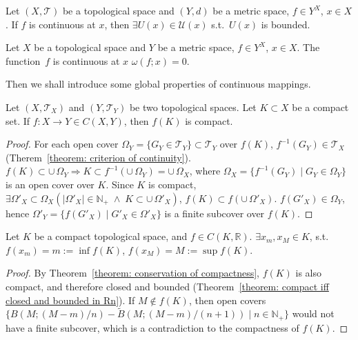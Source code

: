 \documentclass[openany]{book}
\begin{document}
\begin{theorem}
	Let $(X, \mathscr T)$ be a topological space and $(Y, d)$ be a metric space, $f \in Y^X$, $x \in X$. 
	If $f$ is continuous at $x$, then $\exists U(x) \in \mathscr U(x)$ s.t.\ $U(x)$ is bounded.
\end{theorem}

\begin{theorem}
		\label{theorem: continuous iff oscillation is zero}
	Let $X$ be a topological space and $Y$ be a metric space, $f \in Y^X$, $x \in X$. 
	The function~$f$ is continuous at $x$  $\omega(f; x) = 0$. 	
\end{theorem}

Then we shall introduce some global properties of continuous mappings.

\begin{theorem}
		\label{theorem: conservation of compactness}
	Let $(X, \mathscr T_X)$ and $(Y, \mathscr T_Y)$ be two topological spaces. 
	Let $K \subset X$ be a compact set. 
	If $f \colon X \to Y \in C(X, Y)$, then $f(K)$ is compact.
\end{theorem}
\begin{proof}
	For each open cover $\Omega_Y = \{ G_Y \in \mathscr T_Y\} \subset \mathscr T_Y$ over $f( K)$, $f^{-1} ( G_Y) \in \mathscr T_X$ (Therem~\ref{theorem: criterion of continuity}). $f( K) \subset \cup\,\Omega_Y \Rightarrow K \subset f^{-1} \left(  \cup\,\Omega_Y \right) = \cup\,\Omega_X $, where $\Omega_X = \{ f^{-1} ( G_Y) \mid G_Y \in \Omega_Y\} $ is an open cover over $K$. Since $K$ is compact,
	$\exists \Omega'_X \subset \Omega_X\left( 
	\lvert \Omega'_X \rvert \in \mathbb{N}_+ 
	\;\wedge\;K\subset \cup\,\Omega'_X
	\right)$, $f( K) \subset f ( \cup\,\Omega'_X) $. $f ( G'_X) \in \Omega_Y$, hence $\Omega'_Y = \{ f ( G'_X) \mid G'_X \in \Omega'_X\}$ is a finite subcover over $f( K)$.
\end{proof}


\begin{theorem}
	\label{theorem: Weierstrass maximum-value}
	Let $K$ be a compact topological space, and $f \in C (K, \mathbb R)$.
	$\exists x_m, x_M \in K$, s.t.\ $f(x_m) = m := \inf f(K)$, $f(x_M) = M := \sup f(K)$.
\end{theorem}
\begin{proof}
	By Theorem~\ref{theorem: conservation of compactness}, $f(K)$ is also compact, and therefore closed and bounded (Theorem~\ref{theorem: compact iff closed and bounded in Rn}). 
	If $M \notin f(K)$, then open covers $\{ B(M; (M-m)/n) - \tilde B(M; (M-m)/(n + 1)) \mid  n \in \mathbb N_+\} $ would not have a finite subcover, which is a contradiction to the compactness of $f(K)$.
\end{proof}
\end{document}
